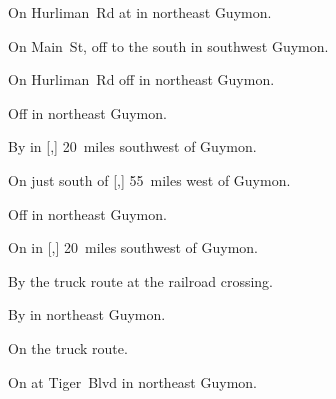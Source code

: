 
\begin{LocationList}

On Hurliman~Rd at   in northeast Guymon.

On Main~St, off  to the south in southwest Guymon.

On Hurliman~Rd off   in northeast Guymon.

Off   in northeast Guymon.

By  in [,] 20~miles southwest of Guymon.

On  just south of [,] 55~miles west of Guymon.

\pagebreak[3]  %

Off   in northeast Guymon.

On  in [,] 20~miles southwest of Guymon.

By the    truck route at the railroad crossing.

\Location{\TruckService \Rest \Service}
By   in northeast Guymon.

\Location{\TruckStop \Gas \Rest \Weigh}
On the    truck route.

On    at Tiger~Blvd in northeast Guymon.

\end{LocationList}
